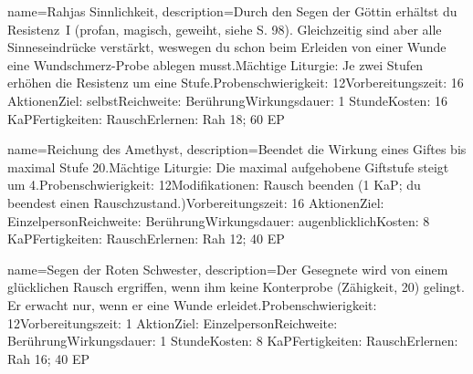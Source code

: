 {
    name={Rahjas Sinnlichkeit},
    description={Durch den Segen der Göttin erhältst du Resistenz I (profan, magisch, geweiht, siehe S. 98). Gleichzeitig sind aber alle Sinneseindrücke verstärkt, weswegen du schon beim Erleiden von einer Wunde eine Wundschmerz-Probe ablegen musst.\newline Mächtige Liturgie: Je zwei Stufen erhöhen die Resistenz um eine Stufe.\newline Probenschwierigkeit: 12\newline Vorbereitungszeit: 16 Aktionen\newline Ziel: selbst\newline Reichweite: Berührung\newline Wirkungsdauer: 1 Stunde\newline Kosten: 16 KaP\newline Fertigkeiten: Rausch\newline Erlernen: Rah 18; 60 EP}
}


{
    name={Reichung des Amethyst},
    description={Beendet die Wirkung eines Giftes bis maximal Stufe 20.\newline Mächtige Liturgie: Die maximal aufgehobene Giftstufe steigt um 4.\newline Probenschwierigkeit: 12\newline Modifikationen: Rausch beenden (1 KaP; du beendest einen Rauschzustand.)\newline Vorbereitungszeit: 16 Aktionen\newline Ziel: Einzelperson\newline Reichweite: Berührung\newline Wirkungsdauer: augenblicklich\newline Kosten: 8 KaP\newline Fertigkeiten: Rausch\newline Erlernen: Rah 12; 40 EP}
}


{
    name={Segen der Roten Schwester},
    description={Der Gesegnete wird von einem glücklichen Rausch ergriffen, wenn ihm keine Konterprobe (Zähigkeit, 20) gelingt. Er erwacht nur, wenn er eine Wunde erleidet.\newline Probenschwierigkeit: 12\newline Vorbereitungszeit: 1 Aktion\newline Ziel: Einzelperson\newline Reichweite: Berührung\newline Wirkungsdauer: 1 Stunde\newline Kosten: 8 KaP\newline Fertigkeiten: Rausch\newline Erlernen: Rah 16; 40 EP}
}


